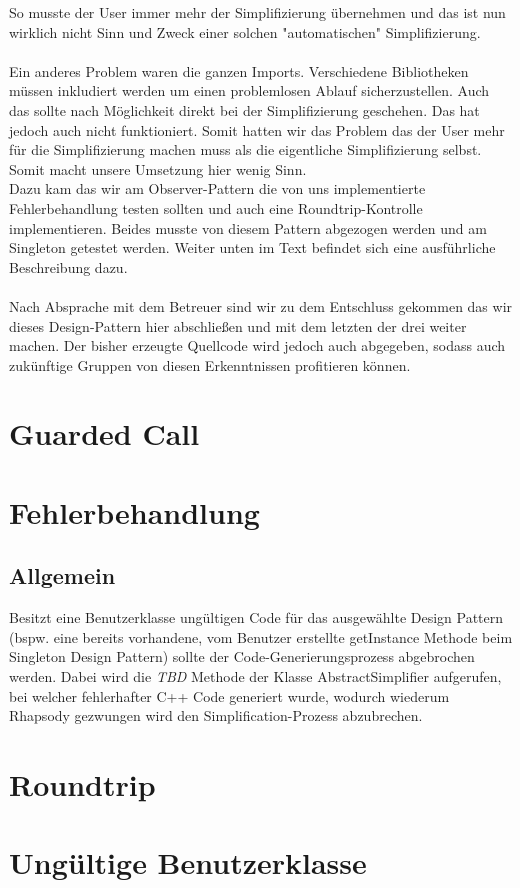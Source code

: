 So musste der User immer mehr der Simplifizierung übernehmen und das ist nun
wirklich nicht Sinn und Zweck einer solchen "automatischen" Simplifizierung.\\
\\
Ein anderes Problem waren die ganzen Imports. Verschiedene Bibliotheken müssen
inkludiert werden um einen problemlosen Ablauf sicherzustellen. Auch das sollte
nach Möglichkeit direkt bei der Simplifizierung geschehen. Das hat jedoch auch
nicht funktioniert. Somit hatten wir das Problem das der User mehr für die
Simplifizierung machen muss als die eigentliche Simplifizierung selbst. Somit
macht unsere Umsetzung hier wenig Sinn.\\
Dazu kam das wir am Observer-Pattern die von uns implementierte Fehlerbehandlung
testen sollten und auch eine Roundtrip-Kontrolle implementieren. Beides musste
von diesem Pattern abgezogen werden und am Singleton getestet werden. Weiter
unten im Text befindet sich eine ausführliche Beschreibung dazu.\\ \\
Nach Absprache mit dem Betreuer sind wir zu dem Entschluss gekommen das wir
dieses Design-Pattern hier abschließen und mit dem letzten der drei weiter machen.
Der bisher erzeugte Quellcode wird jedoch auch abgegeben, sodass auch zukünftige
Gruppen von diesen Erkenntnissen profitieren können.

\section{Guarded Call}

\section{Fehlerbehandlung}

\subsection{Allgemein}
Besitzt eine Benutzerklasse ungültigen Code für das ausgewählte Design Pattern (bspw. eine 
bereits vorhandene, vom Benutzer erstellte getInstance Methode beim Singleton Design Pattern) 
sollte der Code-Generierungsprozess abgebrochen werden. Dabei wird die \textit{TBD} Methode der 
Klasse AbstractSimplifier aufgerufen, bei welcher fehlerhafter C++ Code generiert wurde, wodurch 
wiederum Rhapsody gezwungen wird den Simplification-Prozess abzubrechen.

\section{Roundtrip}


\section{Ungültige Benutzerklasse}

